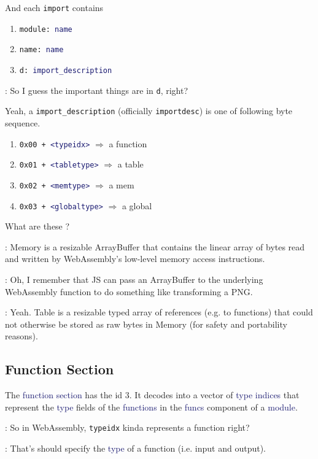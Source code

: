 \documentclass[dvipsnames]{article}
\newcommand{\mycola}{MidnightBlue}
\newcommand{\cola}[1]{\textcolor{\mycola}{#1}}
\begin{document}
And each \texttt{import} contains
\begin{enumerate}
\item \texttt{module: \cola{name}}
\item \texttt{name: \cola{name}}
\item \texttt{d: \cola{import\_description}}
\end{enumerate}

 : So I guess the important things are in \texttt{d}, right?

 Yeah, a \verb|import_description| (officially
\texttt{importdesc}) is one of following byte sequence.

\begin{enumerate}
\item \texttt{0x00 + \cola{<typeidx>}} $\Rightarrow{}$ a function
\item \texttt{0x01 + \cola{<tabletype>}} $\Rightarrow{}$ a table
\item \texttt{0x02 + \cola{<memtype>}} $\Rightarrow{}$ a mem
\item \texttt{0x03 + \cola{<globaltype>}} $\Rightarrow{}$ a global
\end{enumerate}

 What are these ?

 : Memory is a resizable ArrayBuffer that contains the linear
array of bytes read and written by WebAssembly's low-level memory access
instructions.

 : Oh, I remember that JS can pass an ArrayBuffer to the
underlying WebAssembly function to do something like transforming a PNG.

 : Yeah. Table is a resizable typed array of references (e.g. to
functions) that could not otherwise be stored as raw bytes in Memory (for safety
and portability reasons).

\subsection{Function Section}

The \cola{function section} has the id 3. It decodes into a vector of \cola{type
indices} that represent the \cola{type} fields of the \cola{functions} in the
\cola{funcs} component of a \cola{module}.

 : So in WebAssembly, \texttt{typeidx} kinda represents a function
right?

 : That's should specify the \cola{type} of a function (i.e. input
and output).
\end{document}

